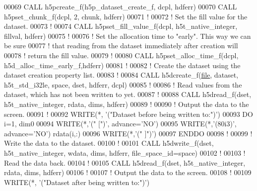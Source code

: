 \begin{DoxyCode}
00069   \textcolor{keyword}{CALL }h5pcreate\_f(h5p\_dataset\_create\_f, dcpl, hdferr)
00070   \textcolor{keyword}{CALL }h5pset\_chunk\_f(dcpl, 2, chunk, hdferr)
00071   \textcolor{comment}{!}
00072   \textcolor{comment}{! Set the fill value for the dataset.}
00073   \textcolor{comment}{!}
00074   \textcolor{keyword}{CALL }h5pset\_fill\_value\_f(dcpl, h5t\_native\_integer, fillval, hdferr)
00075   \textcolor{comment}{!}
00076   \textcolor{comment}{! Set the allocation time to "early".  This way we can be sure}
00077   \textcolor{comment}{! that reading from the dataset immediately after creation will}
00078   \textcolor{comment}{! return the fill value.}
00079   \textcolor{comment}{!}
00080   \textcolor{keyword}{CALL }h5pset\_alloc\_time\_f(dcpl, h5d\_alloc\_time\_early\_f,hdferr)
00081   \textcolor{comment}{!}
00082   \textcolor{comment}{! Create the dataset using the dataset creation property list.}
00083   \textcolor{comment}{!}
00084   \textcolor{keyword}{CALL }h5dcreate\_f(\hyperlink{structfile}{file}, dataset, h5t\_std\_i32le, space, dset, hdferr, dcpl)
00085   \textcolor{comment}{!}
00086   \textcolor{comment}{! Read values from the dataset, which has not been written to yet.}
00087   \textcolor{comment}{!}
00088   \textcolor{keyword}{CALL }h5dread\_f(dset, h5t\_native\_integer, rdata, dims, hdferr)
00089   \textcolor{comment}{!}
00090   \textcolor{comment}{! Output the data to the screen.}
00091   \textcolor{comment}{!}
00092   \textcolor{keyword}{WRITE}(*, \textcolor{stringliteral}{'("Dataset before being written to:")'})
00093   \textcolor{keywordflow}{DO} i=1, dim0
00094      \textcolor{keyword}{WRITE}(*,\textcolor{stringliteral}{'(" [")'}, advance=\textcolor{stringliteral}{'NO'})
00095      \textcolor{keyword}{WRITE}(*,\textcolor{stringliteral}{'(80i3)'}, advance=\textcolor{stringliteral}{'NO'}) rdata(i,:)
00096      \textcolor{keyword}{WRITE}(*,\textcolor{stringliteral}{'(" ]")'})
00097 \textcolor{keywordflow}{  ENDDO}
00098   \textcolor{comment}{!}
00099   \textcolor{comment}{! Write the data to the dataset.}
00100   \textcolor{comment}{!}
00101   \textcolor{keyword}{CALL }h5dwrite\_f(dset, h5t\_native\_integer, wdata, dims, hdferr, file\_space\_id=space)
00102   \textcolor{comment}{!}
00103   \textcolor{comment}{! Read the data back.}
00104   \textcolor{comment}{!}
00105   \textcolor{keyword}{CALL }h5dread\_f(dset, h5t\_native\_integer, rdata, dims, hdferr)
00106   \textcolor{comment}{!}
00107   \textcolor{comment}{! Output the data to the screen.}
00108   \textcolor{comment}{!}
00109   \textcolor{keyword}{WRITE}(*, \textcolor{stringliteral}{'("Dataset after being written to:")'})

\end{DoxyCode}

